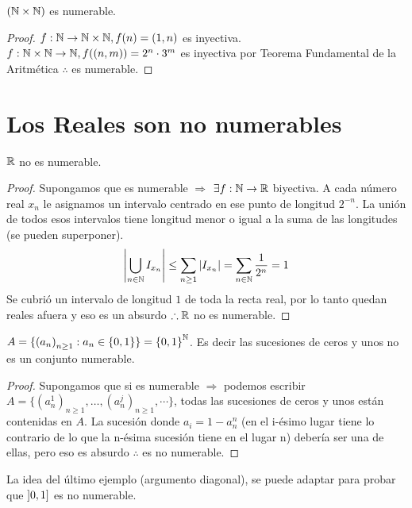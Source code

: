 \begin{eg}
	\((\mathbb{N} \times \mathbb{N})\) es numerable.
	\begin{proof}
		\(f: \mathbb{N} \to \mathbb{N}\times \mathbb{N}, f(n)=(1, n)\) es inyectiva.
		\(f: \mathbb{N}\times \mathbb{N} \to \mathbb{N} , f((n, m))= 2^n \cdot 3^m\) es inyectiva por Teorema Fundamental de la Aritmética \(\therefore \) es numerable.
	\end{proof}
\end{eg}

\section{Los Reales son no numerables}

\begin{theorem}
	\(\mathbb{R} \)  no es numerable.
	\begin{proof}
		Supongamos que es numerable \(\Rightarrow \)
		\(\exists f: \mathbb{N} \to \mathbb{R} \) biyectiva. A cada número real \(x_n\) le asignamos un intervalo centrado en ese punto de longitud \(2^{-n} \). La unión de todos esos intervalos tiene longitud menor o igual a la suma de las longitudes (se pueden superponer).
		\begin{align*}
			\left|\bigcup_{n \in \mathbb{N}} I_{x_n}\right| \leq \sum_{n \geq 1} |I_{x_n}| = \sum_{n \in \mathbb{N}}\dfrac{1}{2^n} = 1
		\end{align*}
		Se cubrió un intervalo de longitud \(1\) de toda la recta real, por lo tanto quedan reales afuera y eso es un absurdo \(\therefore \mathbb{R} \) no es numerable.
	\end{proof}
\end{theorem}

\begin{eg}
	\(A = \{ {(a_n)}_{n \geq 1} : a_n \in \{0, 1\} \} = {\{0, 1\}}^{\mathbb{N}} \). Es decir las sucesiones de ceros y unos no es un conjunto numerable.
	\begin{proof}
		Supongamos que si es numerable \(\Rightarrow \) podemos escribir \\ \(A = \{ {(a_n^1)}_{n\geq1}, \ldots, {(a_n^j)}_{n\geq1}, \cdots \} \), todas las sucesiones de ceros y unos están contenidas en \(A\). La sucesión donde \(a_i=1-a_n^n\) (en el i-ésimo lugar tiene lo contrario de lo que la n-ésima sucesión tiene en el lugar n) debería ser una de ellas, pero eso es absurdo \(\therefore \) es no numerable.
	\end{proof}
\end{eg}

La idea del último ejemplo (argumento diagonal), se puede adaptar para probar que \( \interval[open left]{0}{1} \) es no numerable.

